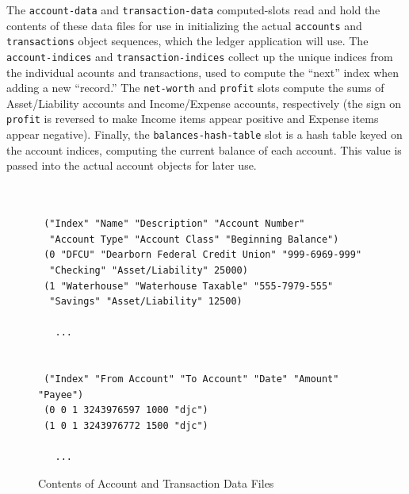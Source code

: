 \documentclass [11pt]{book}
\begin{document}
The \texttt{account-data} and \texttt{transaction-data} computed-slots read and hold the contents of these data files for use in 
initializing the actual \texttt{accounts} and \texttt{transactions} object sequences, which the ledger application will use. The \texttt{account-indices} and \texttt{transaction-indices} collect up the unique indices from the individual acounts and transactions, 
used to compute the ``next'' index when adding a new ``record.'' The \texttt{net-worth} and \texttt{profit} slots compute the sums of Asset/Liability accounts and Income/Expense accounts, 
respectively (the sign on \texttt{profit} is reversed to make Income items appear positive and 
Expense items appear negative). Finally, the \texttt{balances-hash-table} slot is a hash table keyed on the account indices, computing the current balance
of each account. This value is passed into the actual account objects for later use.
\begin{figure}
\begin{lrbox}{\boxedverb}
\begin{minipage}{\linewidth}

\begin{verbatim}


 ("Index" "Name" "Description" "Account Number" 
  "Account Type" "Account Class" "Beginning Balance") 
 (0 "DFCU" "Dearborn Federal Credit Union" "999-6969-999" 
  "Checking" "Asset/Liability" 25000) 
 (1 "Waterhouse" "Waterhouse Taxable" "555-7979-555" 
  "Savings" "Asset/Liability" 12500) 

   ...


 ("Index" "From Account" "To Account" "Date" "Amount" "Payee") 
 (0 0 1 3243976597 1000 "djc") 
 (1 0 1 3243976772 1500 "djc")

   ...

\end{verbatim}
\end{minipage}
\end{lrbox}
\fbox{\usebox{\boxedverb}}

\caption{Contents of Account and Transaction Data Files}

\label{data:ledger-data}

\end{figure}
\end{document}
